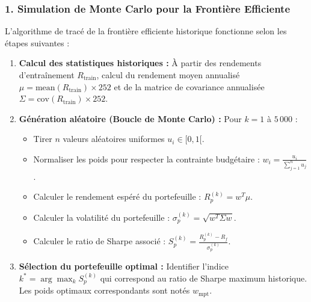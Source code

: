 \subsubsection{1. Simulation de Monte Carlo pour la Frontière Efficiente}
L'algorithme de tracé de la frontière efficiente historique fonctionne selon les étapes suivantes :
\begin{enumerate}
    \item \textbf{Calcul des statistiques historiques :} À partir des rendements d'entraînement $R_{\text{train}}$, calcul du rendement moyen annualisé $\mu = \text{mean}(R_{\text{train}}) \times 252$ et de la matrice de covariance annualisée $\Sigma = \text{cov}(R_{\text{train}}) \times 252$.
    \item \textbf{Génération aléatoire (Boucle de Monte Carlo) :} Pour $k = 1$ à $5\,000$ :
    \begin{itemize}
        \item Tirer $n$ valeurs aléatoires uniformes $u_i \in [0, 1[$.
        \item Normaliser les poids pour respecter la contrainte budgétaire : $w_i = \frac{u_i}{\sum_{j=1}^n u_j}$.
        \item Calculer le rendement espéré du portefeuille : $R_p^{(k)} = w^T \mu$.
        \item Calculer la volatilité du portefeuille : $\sigma_p^{(k)} = \sqrt{w^T \Sigma w}$.
        \item Calculer le ratio de Sharpe associé : $S_p^{(k)} = \frac{R_p^{(k)} - R_f}{\sigma_p^{(k)}}$.
    \end{itemize}
    \item \textbf{Sélection du portefeuille optimal :} Identifier l'indice $k^* = \arg\max_{k} S_p^{(k)}$ qui correspond au ratio de Sharpe maximum historique. Les poids optimaux correspondants sont notés $w_{\text{mpt}}$.
\end{enumerate}

